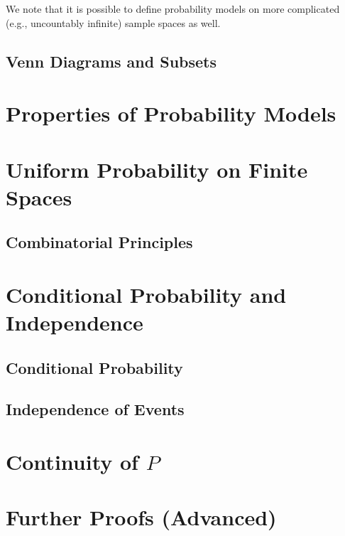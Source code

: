 We note that it is possible to define probability models on more complicated (e.g., uncountably infinite) sample spaces as well.

\subsection{Venn Diagrams and Subsets}
\lipsum[1-10]

\section{Properties of Probability Models}
\lipsum[1-10]

\section{Uniform Probability on Finite Spaces}
\lipsum[1-10]

\subsection{Combinatorial Principles}

\section{Conditional Probability and Independence}

\subsection{Conditional Probability}

\subsection{Independence of Events}

\section{Continuity of $P$}

\section{Further Proofs (Advanced)}